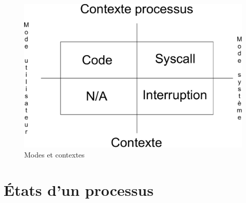 \begin{frame}{\sectitle}
\begin{figure}
\includegraphics[width=.9\textwidth]{images/ContextMode.pdf}
\caption{Modes et contextes}
\end{figure}
\end{frame}

\def\sectitle{États d'un processus}
\section{\sectitle}

